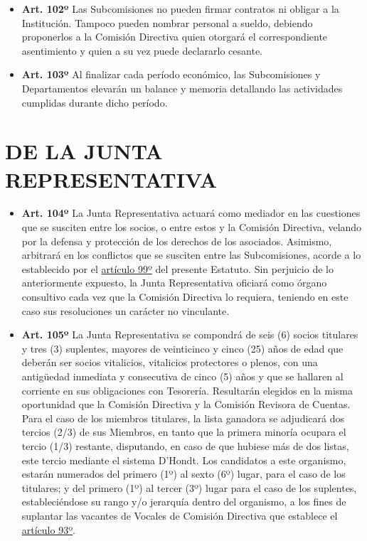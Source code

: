 \documentclass[]{book}
\providecommand{\tightlist}{%
  \setlength{\itemsep}{0pt}\setlength{\parskip}{0pt}}
\begin{document}
\begin{itemize}
\tightlist
\item
  \textbf{Art. 102º}
  Las Subcomisiones no pueden firmar contratos ni obligar a la Institución. Tampoco pueden nombrar personal a sueldo, debiendo proponerlos a la Comisión Directiva quien otorgará el correspondiente asentimiento y quien a su vez puede declararlo cesante.
\end{itemize}

\begin{itemize}
\tightlist
\item
  \textbf{Art. 103º}
  Al finalizar cada período económico, las Subcomisiones y Departamentos elevarán un balance y memoria detallando las actividades cumplidas durante dicho período.
\end{itemize}

\hypertarget{cap21}{%
\chapter{DE LA JUNTA REPRESENTATIVA}\label{cap21}}

\begin{itemize}
\tightlist
\item
  \textbf{Art. 104º}
  La Junta Representativa actuará como mediador en las cuestiones que se susciten entre los socios, o entre estos y la Comisión Directiva, velando por la defensa y protección de los derechos de los asociados. Asimismo, arbitrará en los conflictos que se susciten entre las Subcomisiones, acorde a lo establecido por el \protect\hyperlink{art99}{artículo 99º} del presente Estatuto. Sin perjuicio de lo anteriormente expuesto, la Junta Representativa oficiará como órgano consultivo cada vez que la Comisión Directiva lo requiera, teniendo en este caso sus resoluciones un carácter no vinculante.
\end{itemize}

\begin{itemize}
\tightlist
\item
  \textbf{Art. 105º}
  La Junta Representativa se compondrá de seis (6) socios titulares y tres (3) suplentes, mayores de veinticinco y cinco (25) años de edad que deberán ser socios vitalicios, vitalicios protectores o plenos, con una antigüedad inmediata y consecutiva de cinco (5) años y que se hallaren al corriente en sus obligaciones con Tesorería. Resultarán elegidos en la misma oportunidad que la Comisión Directiva y la Comisión Revisora de Cuentas. Para el caso de los miembros titulares, la lista ganadora se adjudicará dos tercios (2/3) de sus Miembros, en tanto que la primera minoría ocupara el tercio (1/3) restante, disputando, en caso de que hubiese más de dos listas, este tercio mediante el sistema D'Hondt. Los candidatos a este organismo, estarán numerados del primero (1º) al sexto (6º) lugar, para el caso de los titulares; y del primero (1º) al tercer (3º) lugar para el caso de los suplentes, estableciéndose su rango y/o jerarquía dentro del organismo, a los fines de suplantar las vacantes de Vocales de Comisión Directiva que establece el \protect\hyperlink{art93}{artículo 93º}.
\end{itemize}
\end{document}
